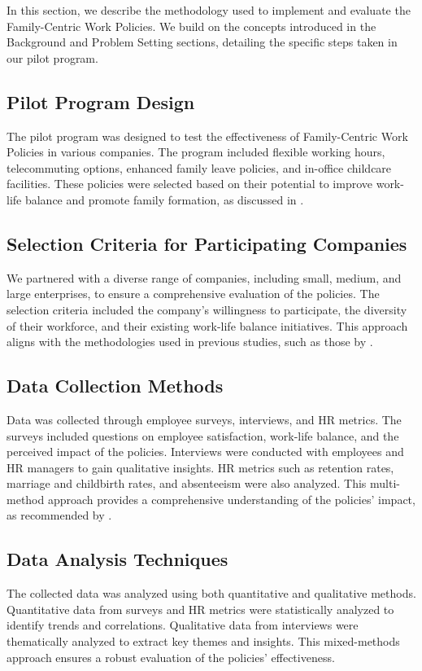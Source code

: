\documentclass{article} %
\begin{document}
In this section, we describe the methodology used to implement and evaluate the Family-Centric Work Policies. We build on the concepts introduced in the Background and Problem Setting sections, detailing the specific steps taken in our pilot program.

\subsection{Pilot Program Design}
The pilot program was designed to test the effectiveness of Family-Centric Work Policies in various companies. The program included flexible working hours, telecommuting options, enhanced family leave policies, and in-office childcare facilities. These policies were selected based on their potential to improve work-life balance and promote family formation, as discussed in \citet{shanahan2023role}.

\subsection{Selection Criteria for Participating Companies}
We partnered with a diverse range of companies, including small, medium, and large enterprises, to ensure a comprehensive evaluation of the policies. The selection criteria included the company's willingness to participate, the diversity of their workforce, and their existing work-life balance initiatives. This approach aligns with the methodologies used in previous studies, such as those by \citet{liu2023agentbench}.

\subsection{Data Collection Methods}
Data was collected through employee surveys, interviews, and HR metrics. The surveys included questions on employee satisfaction, work-life balance, and the perceived impact of the policies. Interviews were conducted with employees and HR managers to gain qualitative insights. HR metrics such as retention rates, marriage and childbirth rates, and absenteeism were also analyzed. This multi-method approach provides a comprehensive understanding of the policies' impact, as recommended by \citet{wang2023describe}.

\subsection{Data Analysis Techniques}
The collected data was analyzed using both quantitative and qualitative methods. Quantitative data from surveys and HR metrics were statistically analyzed to identify trends and correlations. Qualitative data from interviews were thematically analyzed to extract key themes and insights. This mixed-methods approach ensures a robust evaluation of the policies' effectiveness.
\end{document}
